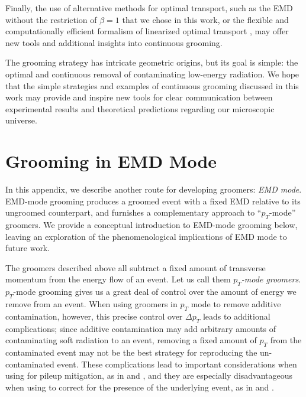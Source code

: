    Finally, the use of alternative methods for optimal transport, such as the EMD without the restriction of \(\beta = 1\) that we chose in this work, or the flexible and computationally efficient formalism of linearized optimal transport \cite{Cai:2020vzx,Cai:2021hnn,cai2022linearized,sarrazin2023linearized}, may offer new tools and additional insights into continuous grooming.

The \PIRANHA{} grooming strategy has intricate geometric origins, but its goal is simple: the optimal and continuous removal of contaminating low-energy radiation.
%
We hope that the simple strategies and examples of continuous grooming discussed in this work may provide and inspire new tools for clear communication between experimental results and theoretical predictions regarding our microscopic universe.

\appendix


\section{Grooming in EMD Mode}
\label{app:grooming_in_emd_mode}


In this appendix, we describe another route for developing \PIRANHA{} groomers:
%
\textit{EMD mode}.
%
EMD-mode grooming produces a groomed event with a fixed EMD relative to its ungroomed counterpart, and furnishes a complementary approach to ``\(p_T\)-mode'' groomers.
%
We provide a conceptual introduction to EMD-mode grooming below, leaving an exploration of the phenomenological implications of EMD mode to future work.


The \PIRANHA{} groomers described above all subtract a fixed amount of transverse momentum from the energy flow of an event.
%
Let us call them \textit{\(p_T\)-mode groomers}.
%
\(p_T\)-mode grooming gives us a great deal of control over the amount of energy we remove from an event.
%
When using \PIRANHA{} groomers in \(p_T\) mode to remove additive contamination, however, this precise control over \(\Delta p_T\) leads to additional complications;
%
since additive contamination may add arbitrary amounts of contaminating soft radiation to an event, removing a fixed amount of \(p_T\) from the contaminated event may not be the best strategy for reproducing the un-contaminated event.
%
These complications lead to important considerations when using \PIRANHA{} for pileup mitigation, as in  and , and they are especially disadvantageous when using \PIRANHA{} to correct for the presence of the underlying event, as in  and .


